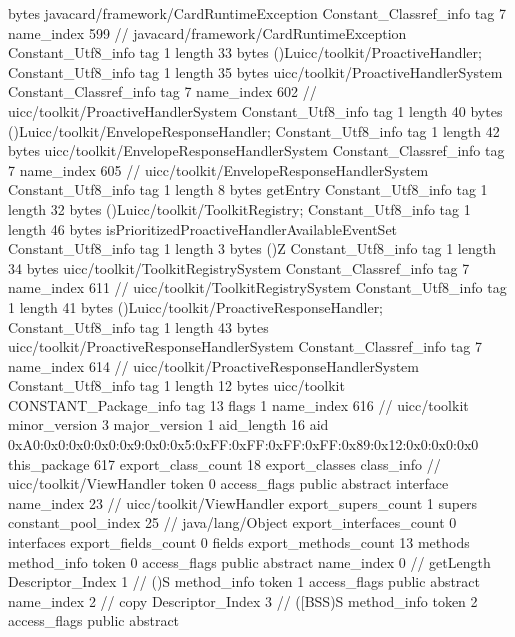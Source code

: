 {{{			bytes	javacard/framework/CardRuntimeException
		}
		Constant_Classref_info {
			tag	7
			name_index	599		// javacard/framework/CardRuntimeException
		}
		Constant_Utf8_info {
			tag	1
			length	33
			bytes	()Luicc/toolkit/ProactiveHandler;
		}
		Constant_Utf8_info {
			tag	1
			length	35
			bytes	uicc/toolkit/ProactiveHandlerSystem
		}
		Constant_Classref_info {
			tag	7
			name_index	602		// uicc/toolkit/ProactiveHandlerSystem
		}
		Constant_Utf8_info {
			tag	1
			length	40
			bytes	()Luicc/toolkit/EnvelopeResponseHandler;
		}
		Constant_Utf8_info {
			tag	1
			length	42
			bytes	uicc/toolkit/EnvelopeResponseHandlerSystem
		}
		Constant_Classref_info {
			tag	7
			name_index	605		// uicc/toolkit/EnvelopeResponseHandlerSystem
		}
		Constant_Utf8_info {
			tag	1
			length	8
			bytes	getEntry
		}
		Constant_Utf8_info {
			tag	1
			length	32
			bytes	()Luicc/toolkit/ToolkitRegistry;
		}
		Constant_Utf8_info {
			tag	1
			length	46
			bytes	isPrioritizedProactiveHandlerAvailableEventSet
		}
		Constant_Utf8_info {
			tag	1
			length	3
			bytes	()Z
		}
		Constant_Utf8_info {
			tag	1
			length	34
			bytes	uicc/toolkit/ToolkitRegistrySystem
		}
		Constant_Classref_info {
			tag	7
			name_index	611		// uicc/toolkit/ToolkitRegistrySystem
		}
		Constant_Utf8_info {
			tag	1
			length	41
			bytes	()Luicc/toolkit/ProactiveResponseHandler;
		}
		Constant_Utf8_info {
			tag	1
			length	43
			bytes	uicc/toolkit/ProactiveResponseHandlerSystem
		}
		Constant_Classref_info {
			tag	7
			name_index	614		// uicc/toolkit/ProactiveResponseHandlerSystem
		}
		Constant_Utf8_info {
			tag	1
			length	12
			bytes	uicc/toolkit
		}
		CONSTANT_Package_info {
			tag	13
			flags	1
			name_index	616		// uicc/toolkit
			minor_version	3
			major_version	1
			aid_length	16
			aid	0xA0:0x0:0x0:0x0:0x9:0x0:0x5:0xFF:0xFF:0xFF:0xFF:0x89:0x12:0x0:0x0:0x0
		}
	}
	this_package	617
	export_class_count	18
	export_classes {
		class_info {		// uicc/toolkit/ViewHandler
			token	0
			access_flags	public abstract interface
			name_index	23		// uicc/toolkit/ViewHandler
			export_supers_count	1
			supers {
				constant_pool_index	25		// java/lang/Object
			}
			export_interfaces_count	0
			interfaces {
			}
			export_fields_count	0
			fields {
			}
			export_methods_count	13
			methods {
				method_info {
					token	0
					access_flags	public abstract
					name_index	0		// getLength
					Descriptor_Index	1		// ()S
				}
				method_info {
					token	1
					access_flags	public abstract
					name_index	2		// copy
					Descriptor_Index	3		// ([BSS)S
				}
				method_info {
					token	2
					access_flags	public abstract
}}}}}
